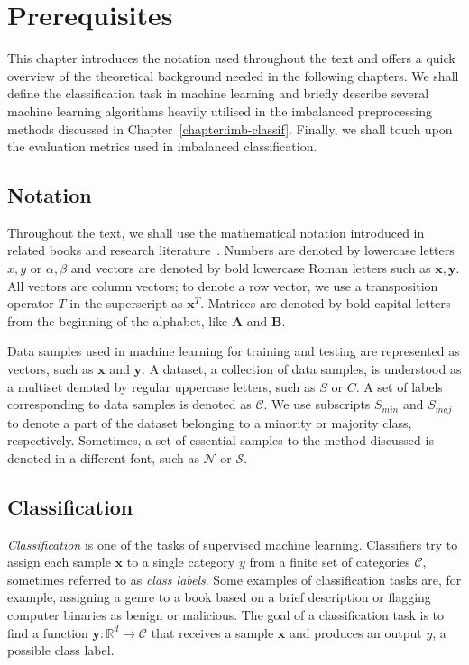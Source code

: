 \chapter{Prerequisites}
\label{chapter:prerequisites}

This chapter introduces the notation used throughout the text and offers a quick overview of the
theoretical background needed in the following chapters. We shall define the classification task in
machine learning and briefly describe several machine learning algorithms heavily utilised in the
imbalanced preprocessing methods discussed in Chapter~\ref{chapter:imb-classif}. Finally, we shall
touch upon the evaluation metrics used in imbalanced classification.


\section{Notation}
\label{section:notation}

Throughout the text, we shall use the mathematical notation introduced in related books and
research literature~\cite{learning-from-imb-data, pattern-recognition}. Numbers are denoted by
lowercase letters $x, y$ or $\alpha, \beta$ and vectors are denoted by bold lowercase Roman letters
such as $\mathbf{x}, \mathbf{y}$. All vectors are column vectors; to denote a row vector, we use a
transposition operator $T$ in the superscript as $\mathbf{x}^T$. Matrices are denoted by bold
capital letters from the beginning of the alphabet, like $\mathbf{A}$ and $\mathbf{B}$.

Data samples used in machine learning for training and testing are represented as vectors, such as
$\mathbf{x}$ and $\mathbf{y}$. A dataset, a collection of data samples, is understood as a multiset
denoted by regular uppercase letters, such as $S$ or $C$. A set of labels corresponding to data
samples is denoted as $\mathcal{C}$. We use subscripts $S_{min}$ and $S_{maj}$ to denote a part of
the dataset belonging to a minority or majority class, respectively. Sometimes, a set of essential
samples to the method discussed is denoted in a different font, such as $\mathcal{N}$ or
$\mathcal{S}$.


\section{Classification}
\label{section:classification}

\emph{Classification} is one of the tasks of supervised machine learning. Classifiers try to assign
each sample $\mathbf{x}$ to a single category $y$ from a finite set of categories $\mathcal{C}$,
sometimes referred to as \emph{class labels}. Some examples of classification tasks are, for
example, assigning a genre to a book based on a brief description or flagging computer binaries as
benign or malicious. The goal of a classification task is to find a function $\mathbf{y} \colon
\mathbb{R}^d \to \mathcal{C}$ that receives a sample $\mathbf{x}$ and produces an output $y$, a
possible class label.

